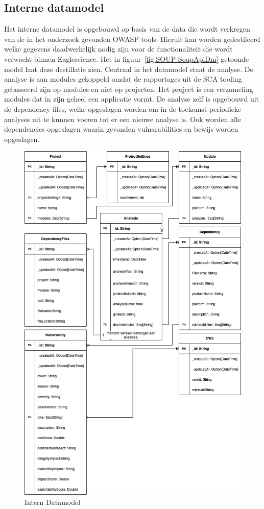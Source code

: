 \subsection{Interne datamodel}\label{subsec:interne-datamodel}
Het interne datamodel is opgebouwd op basis van de data die wordt verkregen van de in het onderzoek gevonden OWASP tools. Hieruit kan worden gedestileerd welke gegevens daadwerkelijk nodig zijn voor de functionaliteit die wordt verwacht binnen Eaglescience. Het in figuur~\ref{fig:SOUP-SoupApiDm} getoonde model laat deze destillatie zien. Centraal in het datamodel staat de analyse. De analyse is aan modules gekoppeld omdat de rapportages uit de SCA tooling gebasseerd zijn op modules en niet op projecten. Het project is een verzameling modules dat in zijn geheel een applicatie vormt. De analyse zelf is opgebouwd uit de dependency files, welke opgeslagen worden om in de toekomst periodieke analyses uit te kunnen voeren tot er een nieuwe analyse is. Ook worden alle dependencies opgeslagen waarin gevonden vulnarabilities en bewijs worden opgeslagen.

\begin{figure}[H]
    \myfloatalign
    \includegraphics[width=15cm]{gfx/SOUPAPI-SOUPAPI DM}
    \caption{Intern Datamodel}
    \label{fig:SOUP-SoupApiDm [CHECKEN]}
\end{figure}

